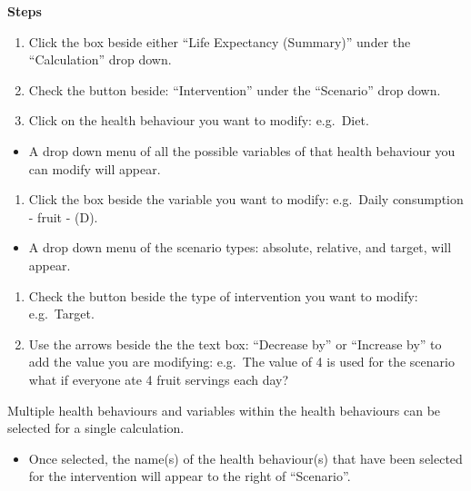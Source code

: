 \documentclass[]{book}
\providecommand{\tightlist}{%
  \setlength{\itemsep}{0pt}\setlength{\parskip}{0pt}}
\begin{document}
\textbf{Steps}

\begin{enumerate}
\def\labelenumi{\arabic{enumi}.}
\item
  Click the box beside either ``Life Expectancy (Summary)'' under the
  ``Calculation'' drop down.
\item
  Check the button beside: ``Intervention'' under the ``Scenario'' drop
  down.
\item
  Click on the health behaviour you want to modify: e.g.~Diet.
\end{enumerate}

\begin{itemize}
\tightlist
\item
  A drop down menu of all the possible variables of that health
  behaviour you can modify will appear.
\end{itemize}

\begin{enumerate}
\def\labelenumi{\arabic{enumi}.}
\setcounter{enumi}{3}
\tightlist
\item
  Click the box beside the variable you want to modify: e.g.~Daily
  consumption - fruit - (D).
\end{enumerate}

\begin{itemize}
\tightlist
\item
  A drop down menu of the scenario types: absolute, relative, and
  target, will appear.
\end{itemize}

\begin{enumerate}
\def\labelenumi{\arabic{enumi}.}
\setcounter{enumi}{4}
\item
  Check the button beside the type of intervention you want to modify:
  e.g.~Target.
\item
  Use the arrows beside the the text box: ``Decrease by'' or ``Increase
  by'' to add the value you are modifying: e.g.~The value of 4 is used
  for the scenario what if everyone ate 4 fruit servings each day?
\end{enumerate}

Multiple health behaviours and variables within the health behaviours
can be selected for a single calculation.

\begin{itemize}
\tightlist
\item
  Once selected, the name(s) of the health behaviour(s) that have been
  selected for the intervention will appear to the right of
  ``Scenario''.
\end{itemize}
\end{document}
